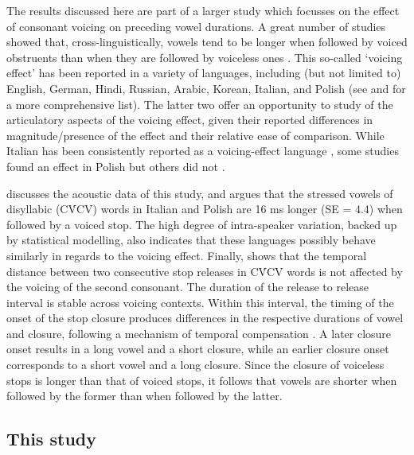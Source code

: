 \documentclass[12pt,]{article}
\begin{document}
The results discussed here are part of a larger study which focusses on
the effect of consonant voicing on preceding vowel durations. A great
number of studies showed that, cross-linguistically, vowels tend to be
longer when followed by voiced obstruents than when they are followed by
voiceless ones
\citep{house1953, peterson1960, chen1970, klatt1973, lisker1974, farnetani1986, fowler1992, hussein1994, esposito2002, lampp2004, durvasula2012}.
This so-called `voicing effect' has been reported in a variety of
languages, including (but not limited to) English, German, Hindi,
Russian, Arabic, Korean, Italian, and Polish (see
\citealt{maddieson1976} and \citealt{begus2017} for a more comprehensive
list). The latter two offer an opportunity to study of the articulatory
aspects of the voicing effect, given their reported differences in
magnitude/presence of the effect and their relative ease of comparison.
While Italian has been consistently reported as a voicing-effect
language \citep{caldognetto1979, farnetani1986, esposito2002}, some
studies found an effect in Polish
\citep{slowiaczek1985, nowak2006, malisz2008, coretta2018j} but others
did not \citep{keating1984, jassem1989}.

\citet{coretta2018j} discusses the acoustic data of this study, and
argues that the stressed vowels of disyllabic (CV́CV) words in Italian
and Polish are 16 ms longer (SE = 4.4) when followed by a voiced stop.
The high degree of intra-speaker variation, backed up by statistical
modelling, also indicates that these languages possibly behave similarly
in regards to the voicing effect. Finally, \citet{coretta2018j} shows
that the temporal distance between two consecutive stop releases in CV́CV
words is not affected by the voicing of the second consonant. The
duration of the release to release interval is stable across voicing
contexts. Within this interval, the timing of the onset of the stop
closure produces differences in the respective durations of vowel and
closure, following a mechanism of temporal compensation
\citep{lindblom1967, slis1969a, slis1969, lehiste1970, lehiste1970a}. A
later closure onset results in a long vowel and a short closure, while
an earlier closure onset corresponds to a short vowel and a long
closure. Since the closure of voiceless stops is longer than that of
voiced stops, it follows that vowels are shorter when followed by the
former than when followed by the latter.

\hypertarget{this-study}{%
\subsection{This study}\label{this-study}}
\end{document}
